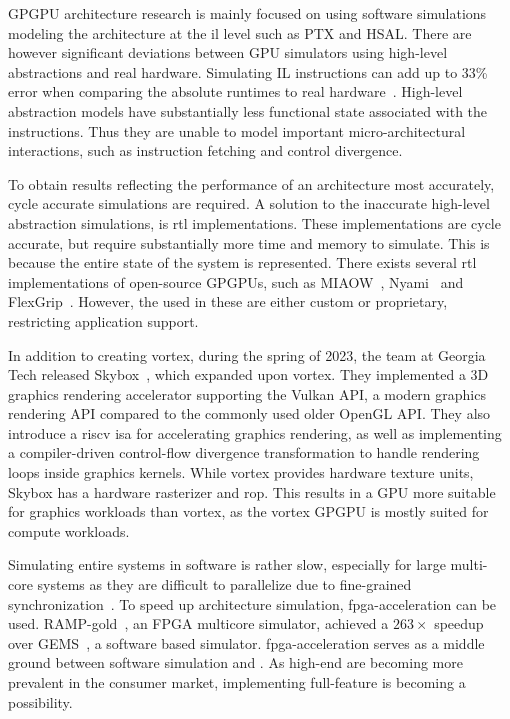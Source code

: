 GPGPU architecture research is mainly focused on using software simulations~\cite{gem5_gpu, gpu_sim_cuda, multi2sim} modeling the architecture at the \acrfull{il} level such as PTX and HSAL. There are however significant deviations between GPU simulators using high-level abstractions and real hardware. Simulating IL instructions can add up to 33\% error when comparing the absolute runtimes to real hardware~\cite{lost_in_abstraction}. High-level abstraction models have substantially less functional state associated with the instructions. Thus they are unable to model important micro-architectural interactions, such as instruction fetching and control divergence.

To obtain results reflecting the performance of an architecture most accurately, cycle accurate simulations are required. A solution to the inaccurate high-level abstraction simulations, is \acrfull{rtl} implementations. These implementations are cycle accurate, but require substantially more time and memory to simulate. This is because the entire state of the system is represented. There exists several \acrshort{rtl} implementations of open-source GPGPUs, such as MIAOW~\cite{MIAOW}, Nyami~\cite{Nyami} and FlexGrip~\cite{FlexGrip}. However, the  used in these  are either custom or proprietary, restricting application support.

In addition to creating \Gls{vortex}, during the spring of 2023, the team at Georgia Tech released Skybox~\cite{skybox}, which expanded upon \Gls{vortex}. They implemented a 3D graphics rendering accelerator supporting the Vulkan API, a modern graphics rendering API compared to the commonly used older OpenGL API. They also introduce a \Gls{riscv} \acrshort{isa} for accelerating graphics rendering, as well as implementing a compiler-driven control-flow divergence transformation to handle rendering loops inside graphics kernels. While \Gls{vortex} provides hardware texture units, Skybox has a hardware rasterizer and \acrfull{rop}. This results in a GPU more suitable for graphics workloads than \Gls{vortex}, as the \Gls{vortex} GPGPU is mostly suited for compute workloads.

Simulating entire systems in software is rather slow, especially for large multi-core systems as they are difficult to parallelize due to fine-grained synchronization~\cite{graphite, wwt2}. To speed up architecture simulation, \acrshort{fpga}-acceleration can be used. RAMP-gold~\cite{RAMP-gold}, an FPGA multicore simulator, achieved a $263\times$ speedup over GEMS~\cite{gems}, a software based simulator. \acrshort{fpga}-acceleration serves as a middle ground between software simulation and . As high-end  are becoming more prevalent in the consumer market, implementing full-feature  is becoming a possibility.

